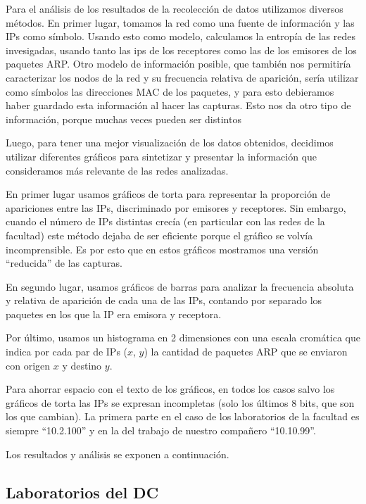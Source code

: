 Para el análisis de los resultados de la recolección de datos utilizamos
diversos métodos. En primer lugar, tomamos la red como una fuente de
información y las IPs como símbolo. Usando esto como modelo, calculamos la
entropía de las redes invesigadas, usando tanto las ips de los receptores como
las de los emisores de los paquetes ARP. Otro modelo de información posible,
que también nos permitiría caracterizar los nodos de la red y su frecuencia
relativa de aparición, sería utilizar como símbolos las direcciones MAC de los
paquetes, y para esto debieramos haber guardado esta información al hacer las capturas. Esto nos da otro tipo de información, porque muchas veces pueden ser
distintos 

Luego, para tener una mejor visualización de los datos obtenidos, decidimos
utilizar diferentes gráficos para sintetizar y presentar la información que
consideramos más relevante de las redes analizadas.

En primer lugar usamos gráficos de torta para representar la proporción de
apariciones entre las IPs, discriminado por emisores y receptores. Sin embargo,
cuando el número de IPs distintas crecía (en particular con las redes de la
facultad) este método dejaba de ser eficiente porque el gráfico se volvía
incomprensible. Es por esto que en estos gráficos mostramos una versión
``reducida'' de las capturas.

En segundo lugar, usamos gráficos de barras para analizar la frecuencia
absoluta y relativa de aparición de cada una de las IPs, contando por separado
los paquetes en los que la IP era emisora y receptora.

Por último, usamos un histograma en 2 dimensiones con una escala cromática
que indica por cada par de IPs ($x$, $y$) la cantidad de paquetes ARP que se enviaron con origen $x$ y destino $y$.

Para ahorrar espacio con el texto de los gráficos, en todos los casos salvo los
gráficos de torta las IPs se expresan incompletas (solo los últimos 8 bits, que
son los que cambian). La primera parte en el caso de los laboratorios de la
facultad es siempre ``10.2.100'' y en la del trabajo de nuestro compañero
``10.10.99''.

Los resultados y análisis se exponen a continuación.


\subsection{Laboratorios del DC}

